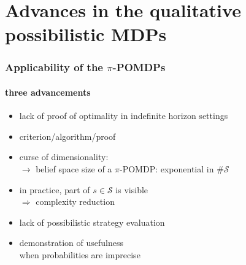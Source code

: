 \documentclass[12pt,svgnames,table]{beamer}
\begin{document}
\section[advancements in $\pi$-POMDP]{Advances in the qualitative possibilistic MDPs}%
\begin{frame}
\frametitle{Applicability of the $\pi$-POMDPs}
\framesubtitle{\footnotesize three advancements}
\vspace{0.2cm}
\begin{itemize}
\item<alert@+> lack of proof of optimality in indefinite horizon settings
\item criterion/algorithm/proof
\end{itemize}
\vspace{0.4cm}
\begin{itemize}
\item<alert@+> curse of dimensionality: \\
$\rightarrow$ belief space size of a $\pi$-POMDP:  exponential in $\# \mathcal{S}$\\
\item in practice, part of $s \in \mathcal{S}$ is visible\\
\hspace{4cm} $\Rightarrow$ complexity reduction  
\end{itemize}
\vspace{0.4cm}
\begin{itemize}
\item<alert@+> lack of possibilistic strategy evaluation
\item demonstration of usefulness\\ 
when probabilities are imprecise 
\end{itemize}




\end{frame}
\end{document}

